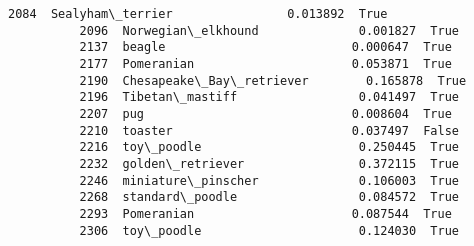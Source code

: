 \documentclass[11pt]{article}
\begin{document}
\begin{Verbatim}[commandchars=\\\{\}]
          2084  Sealyham\_terrier                0.013892  True    
          2096  Norwegian\_elkhound              0.001827  True    
          2137  beagle                          0.000647  True    
          2177  Pomeranian                      0.053871  True    
          2190  Chesapeake\_Bay\_retriever        0.165878  True    
          2196  Tibetan\_mastiff                 0.041497  True    
          2207  pug                             0.008604  True    
          2210  toaster                         0.037497  False   
          2216  toy\_poodle                      0.250445  True    
          2232  golden\_retriever                0.372115  True    
          2246  miniature\_pinscher              0.106003  True    
          2268  standard\_poodle                 0.084572  True    
          2293  Pomeranian                      0.087544  True    
          2306  toy\_poodle                      0.124030  True    
          

\end{Verbatim}
\end{document}
